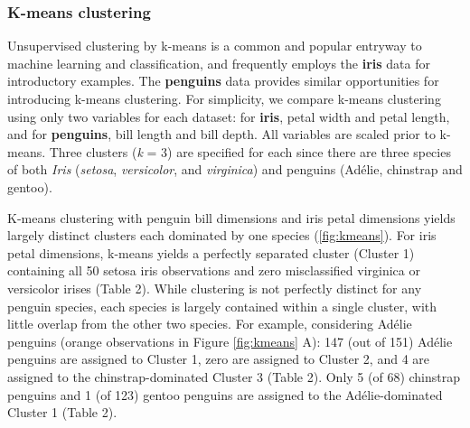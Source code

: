 \hypertarget{k-means-clustering}{%
\subsubsection{K-means clustering}\label{k-means-clustering}}

Unsupervised clustering by k-means is a common and popular entryway to
machine learning and classification, and frequently employs the
\textbf{iris} data for introductory examples. The \textbf{penguins} data
provides similar opportunities for introducing k-means clustering. For
simplicity, we compare k-means clustering using only two variables for
each dataset: for \textbf{iris}, petal width and petal length, and for
\textbf{penguins}, bill length and bill depth. All variables are scaled
prior to k-means. Three clusters (\emph{k} = 3) are specified for each
since there are three species of both \emph{Iris} (\emph{setosa},
\emph{versicolor}, and \emph{virginica}) and penguins (Adélie, chinstrap
and gentoo).

K-means clustering with penguin bill dimensions and iris petal
dimensions yields largely distinct clusters each dominated by one
species (\ref{fig:kmeans}). For iris petal dimensions, k-means yields a
perfectly separated cluster (Cluster 1) containing all 50 setosa iris
observations and zero misclassified virginica or versicolor irises
(Table 2). While clustering is not perfectly distinct for any penguin
species, each species is largely contained within a single cluster, with
little overlap from the other two species. For example, considering
Adélie penguins (orange observations in Figure \ref{fig:kmeans} A): 147
(out of 151) Adélie penguins are assigned to Cluster 1, zero are
assigned to Cluster 2, and 4 are assigned to the chinstrap-dominated
Cluster 3 (Table 2). Only 5 (of 68) chinstrap penguins and 1 (of 123)
gentoo penguins are assigned to the Adélie-dominated Cluster 1 (Table
2).

